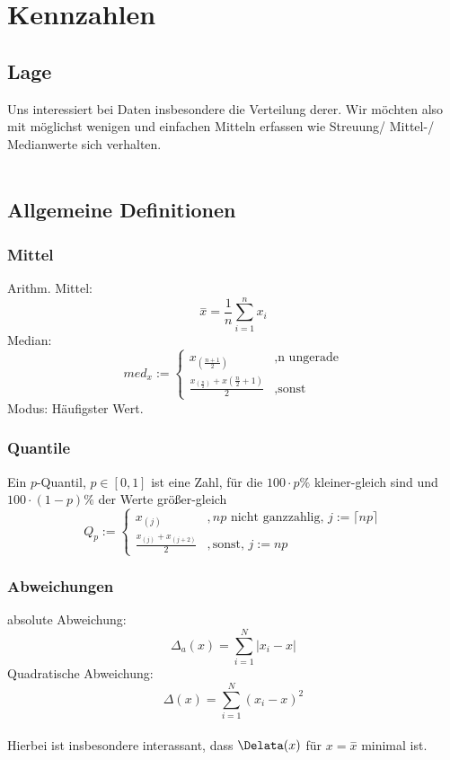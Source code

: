 \section{Kennzahlen}
\subsection{Lage}
Uns interessiert bei Daten insbesondere die Verteilung derer.
    Wir möchten also mit möglichst wenigen und einfachen Mitteln
    erfassen wie Streuung/ Mittel-/ Medianwerte sich verhalten.\\
\\
\subsection{Allgemeine Definitionen}
\subsubsection{Mittel}
Arithm. Mittel:\\
$$
    \overset{-}{x} = \frac{1}{n} \sum_{i=1}^n x_i
$$
Median:\\
$$
    med_x := \begin{cases}
        x_(\frac{n+1}{2})                               &, \text{n ungerade}\\
        \frac{x_(\frac{n}{2}) + x(\frac{n}{2} + 1)}{2}  &, \text{sonst}
    \end{cases}
$$
Modus: Häufigster Wert.\\
\subsubsection{Quantile}
Ein $p$-Quantil, $p \in [0,1]$ ist eine Zahl, für die $100 \cdot p \%$ 
    kleiner-gleich sind und $100 \cdot (1-p) \%$ der Werte größer-gleich\\
$$ 
    Q_p := \begin{cases}
        x_{(j)}                             &,\text{$np$ nicht ganzzahlig,
                                                    $j := \lceil np \rceil$}\\
        \frac{x_{(j)} + x_{(j+2)}}{2}       &,\text{sonst,
                                                    $j := np$}
    \end{cases}
$$
\subsubsection{Abweichungen}
absolute Abweichung:\\
$$
    \Delta_a(x) = \sum_{i=1}^N |x_i - x|
$$
Quadratische Abweichung:\\
$$
    \Delta(x) = \sum_{i=1}^N (x_i - x)^2
$$
\\
Hierbei ist insbesondere interassant, dass $\Delata(x)$ für $x = \overset{-}{x}$
    minimal ist.\\

